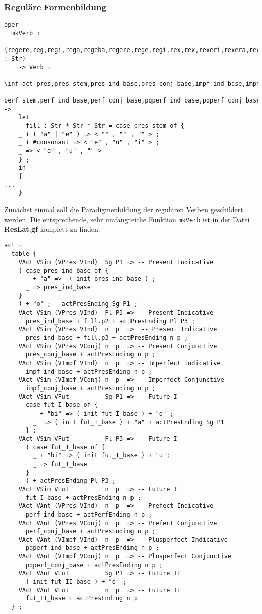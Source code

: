 \subsubsection{Reguläre Formenbildung}
\begin{lstlisting}[float=h!tp,caption={Kopf der Funktion um reguläre Verbformen zu bilden (vgl. \textbf{ResLat.gf})},label={GF-Res-MkVerb},basicstyle=\small]
oper
  mkVerb : 
    (regere,reg,regi,rega,regeba,regere,rege,regi,rex,rex,rexeri,rexera,rexisse,rexeri,rect : Str) 
    -> Verb = 
    \inf_act_pres,pres_stem,pres_ind_base,pres_conj_base,impf_ind_base,impf_conj_base,fut_I_base,imp_base,
    perf_stem,perf_ind_base,perf_conj_base,pqperf_ind_base,pqperf_conj_base,fut_II_base,part_stem -> 
    let
      fill : Str * Str * Str = case pres_stem of {
	_ + ( "a" | "e" ) => < "" , "" , "" > ;
	_ + #consonant => < "e" , "u" , "i" > ;
	_ => < "e" , "u" , "" >
	} ;
    in 
    {
...
    }
\end{lstlisting}
Zunächst einmal soll die Paradigmenbildung der regulären Verben geschildert werden. Die entsprechende, sehr umfangreiche Funktion \texttt{mkVerb} ist in der Datei \textbf{ResLat.gf} komplett zu finden. \par
\begin{lstlisting}[float=h!tp,caption={Ausschnitt aus der Funktion \texttt{mkVerb} um aktive Verbformen zu bilden (vgl. \textbf{ResLat.gf})},label={GF-Res-MkVerb-Act},basicstyle=\small]
act = 
  table {
    VAct VSim (VPres VInd)  Sg P1 => -- Present Indicative
    ( case pres_ind_base of {
      _ + "a" =>  ( init pres_ind_base ) ;
      _ => pres_ind_base
    }
    ) + "o" ; --actPresEnding Sg P1 ;
    VAct VSim (VPres VInd)  Pl P3 => -- Present Indicative
      pres_ind_base + fill.p2 + actPresEnding Pl P3 ;
    VAct VSim (VPres VInd)  n  p  =>  -- Present Indicative
      pres_ind_base + fill.p3 + actPresEnding n p ;
    VAct VSim (VPres VConj) n  p  => -- Present Conjunctive
      pres_conj_base + actPresEnding n p ; 
    VAct VSim (VImpf VInd)  n  p  => -- Imperfect Indicative
      impf_ind_base + actPresEnding n p ; 
    VAct VSim (VImpf VConj) n  p  => -- Imperfect Conjunctive
      impf_conj_base + actPresEnding n p ; 
    VAct VSim VFut          Sg P1 => -- Future I
      case fut_I_base of {
        _ + "bi" => ( init fut_I_base ) + "o" ;
        _  => ( init fut_I_base ) + "a" + actPresEnding Sg P1 
      } ;
    VAct VSim VFut          Pl P3 => -- Future I
      ( case fut_I_base of {
        _ + "bi" => ( init fut_I_base ) + "u";
        _ => fut_I_base
      } 
      ) + actPresEnding Pl P3 ;
    VAct VSim VFut          n  p  => -- Future I
      fut_I_base + actPresEnding n p ; 
    VAct VAnt (VPres VInd)  n  p  => -- Prefect Indicative
      perf_ind_base + actPerfEnding n p ; 
    VAct VAnt (VPres VConj) n  p  => -- Prefect Conjunctive
      perf_conj_base + actPresEnding n p ; 
    VAct VAnt (VImpf VInd)  n  p  => -- Plusperfect Indicative
      pqperf_ind_base + actPresEnding n p ; 
    VAct VAnt (VImpf VConj) n  p  => -- Plusperfect Conjunctive
      pqperf_conj_base + actPresEnding n p ; 
    VAct VAnt VFut          Sg P1 => -- Future II 
      ( init fut_II_base ) + "o" ; 
    VAct VAnt VFut          n  p  => -- Future II 
      fut_II_base + actPresEnding n p 
  } ;
\end{lstlisting}
